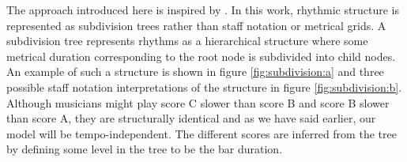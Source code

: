 
The approach introduced here is inspired by \citet{longuet1976perception}. In this work, rhythmic structure is represented as subdivision trees rather than staff notation or metrical grids. A subdivision tree represents rhythms as a hierarchical structure where some metrical duration corresponding to the root node is subdivided into child nodes. An example of such a structure is shown in figure \ref{fig:subdivision:a} and three possible staff notation interpretations of the structure in figure \ref{fig:subdivision:b}. Although musicians might play score C slower than score B and score B slower than score A, they are structurally identical and as we have said earlier, our model will be tempo-independent. The different scores are inferred from the tree by defining some level in the tree to be the bar duration.

